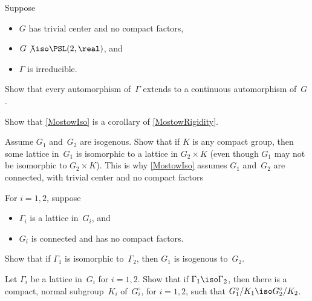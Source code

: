 \begin{exercises}

\item Suppose 
	\begin{itemize}
	\item $G$ has trivial center and no compact factors,
	\item  $G \not\iso \PSL(2,\real)$,
	and
	\item $\Gamma$ is irreducible. 
	\end{itemize}
Show that every automorphism of~$\Gamma$ extends to a continuous automorphism of~$G$.

\item Show that \cref{MostowIso} is a corollary of \cref{MostowRigidity}.

\item \label{NotIsoForCpctFactors}
Assume $G_1$ and~$G_2$ are isogenous. Show that if $K$ is any compact group, then some lattice in~$G_1$ is isomorphic to a lattice in $G_2 \times K$ (even though $G_1$ may not be isomorphic to $G_2 \times K$). This is why \cref{MostowIso} assumes $G_1$ and~$G_2$ are connected, with trivial center and no compact factors

\item For $i = 1,2$, suppose 
	\begin{itemize}
	\item $\Gamma_i$ is a lattice in~$G_i$, 
	and 
	\item $G_i$ is connected and has no compact factors. 
	\end{itemize}
Show that if $\Gamma_1$ is isomorphic to~$\Gamma_2$, then $G_1$ is isogenous to~$G_2$.

\item Let $\Gamma_i$ be a lattice in~$G_i$ for $i = 1,2$. Show that if $\Gamma_1 \iso \Gamma_2$, then there is a compact, normal subgroup~$K_i$ of~$G_i^\circ$, for $i = 1,2$, such that $G_1^\circ/K_1 \iso G_2^\circ/K_2$.



\end{exercises}
